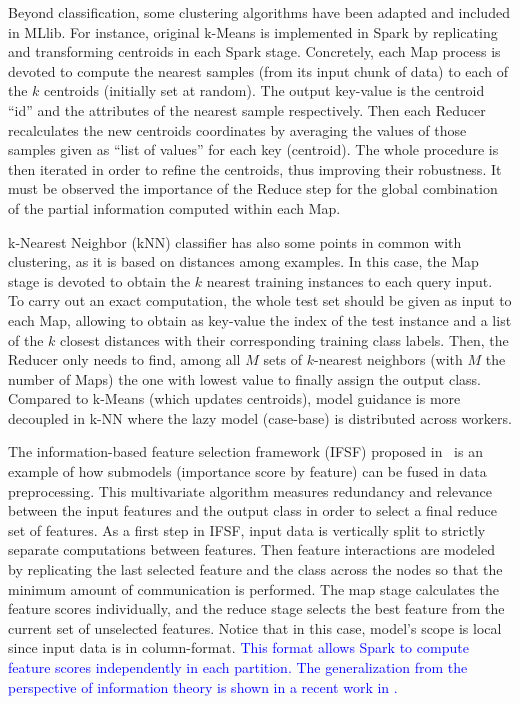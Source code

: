 \documentclass[3p,review]{elsarticle}
\begin{document}
	
	Beyond classification, some clustering algorithms have been adapted and included in MLlib. For instance, original k-Means is implemented in Spark by replicating and transforming centroids in each Spark stage. Concretely, each Map process is devoted to compute the nearest samples (from its input chunk of data) to each of the $k$ centroids (initially set at random). The output key-value is the centroid ``id'' and the attributes of the nearest sample respectively. Then each Reducer recalculates the new centroids coordinates by averaging the values of those samples given as ``list of values'' for each key (centroid). The whole procedure is then iterated in order to refine the centroids, thus improving their robustness. It must be observed the importance of the Reduce step for the global combination of the partial information computed within each Map.  
	
	k-Nearest Neighbor (kNN) classifier \cite{MailloRTH17-kNN} has also some points in common with clustering, as it is based on distances among examples. In this case, the Map stage is devoted to obtain the $k$ nearest training instances to each query input. To carry out an exact computation, the whole test set should be given as input to each Map, allowing to obtain as key-value the index of the test instance and a list of the $k$ closest distances with their corresponding training class labels. Then, the Reducer only needs to find, among all $M$ sets of $k$-nearest neighbors (with $M$ the number of Maps) the one with lowest value to finally assign the output class. Compared to k-Means (which updates centroids), model guidance is more decoupled in k-NN where the lazy model (case-base) is distributed across workers.
	
	The information-based feature selection framework (IFSF) proposed in~\cite{Ramirez-Gallego17-mrmr} is an example of how submodels (importance score by feature) can be fused in data preprocessing. This multivariate algorithm measures redundancy and relevance between the input features and the output class in order to select a final reduce set of features. As a first step in IFSF, input data is vertically split to strictly separate computations between features. Then feature interactions are modeled by replicating the last selected feature and the class across the nodes so that the minimum amount of communication is performed. The map stage calculates the feature scores individually, and the reduce stage selects the best feature from the current set of unselected features. Notice that in this case, model's scope is local since input data is in column-format. \textcolor{blue}{This format allows Spark to compute feature scores independently in each partition. The generalization from the perspective of information theory is shown in a recent work in \cite{Sergio17}.}
	
\end{document}
